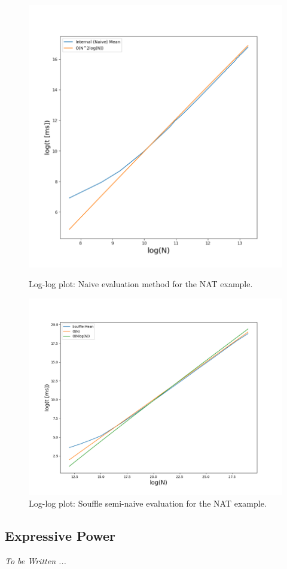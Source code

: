 \begin{figure}%
	\begin{minipage}[b]{.5\textwidth}
		\includegraphics[width=\textwidth]{img/internalloglog.png}
		\caption{Log-log plot: Naive evaluation method for the NAT example.}
		\label{figure:internalloglog}
	\end{minipage}%
     \hspace*{10pt}
	\begin{minipage}[b]{.5\textwidth}
		\includegraphics[width=\textwidth]{img/souffleloglog.png}
		\caption{Log-log plot: Souffle semi-naive evaluation for the NAT example.}
		\label{figure:souffleloglog}
	\end{minipage}
\end{figure}



\subsection{Expressive Power}
\textit{To be Written ... }
